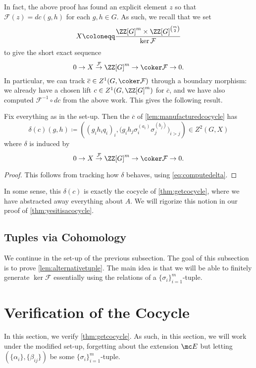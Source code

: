 \documentclass{article}
\numberwithin{equation}{section}
\begin{document}
In fact, the above proof has found an explicit element $z$ so that $\mathcal F(z)=dc(g,h)$ for each $g,h\in G$. As such, we recall that we set
\[X\coloneqq\frac{\ZZ[G]^m\times\ZZ[G]^{\binom m2}}{\ker\mathcal F}\]
to give the short exact sequence
\[0\to X\stackrel{\mathcal F}\to\ZZ[G]^m\to\coker\mathcal F\to0.\]
In particular, we can track $\overline c\in Z^1(G,\coker\mathcal F)$ through a boundary morphism: we already have a chosen lift $c\in Z^1(G,\ZZ[G]^m)$ for $\overline c$, and we have also computed $\mathcal F^{-1}\circ dc$ from the above work. This gives the following result.
\begin{cor}
	Fix everything as in the set-up. Then the $\overline c$ of \autoref{lem:manufacturedcocycle} has
	\[\delta(c)(g,h)\coloneqq\left((g_ih_iq_i)_i,\big(g_ih_j\sigma_i^{(a_i)}\sigma_j^{(b_j)}\big)_{i>j}\right)\in Z^2(G,X)\]
	where $\delta$ is induced by
	\[0\to X\stackrel{\mathcal F}\to\ZZ[G]^m\to\coker\mathcal F\to0.\]
\end{cor}
\begin{proof}
	This follows from tracking how $\delta$ behaves, using \autoref{eq:computedelta}.
\end{proof}
\begin{remark}
	In some sense, this $\delta(c)$ is exactly the cocycle of \autoref{thm:getcocycle}, where we have abstracted away everything about $A$. We will rigorize this notion in our proof of \autoref{thm:yesitisacocycle}.
\end{remark}

\subsection{Tuples via Cohomology}
We continue in the set-up of the previous subsection. The goal of this subsection is to prove \autoref{lem:alternativetuple}. The main idea is that we will be able to finitely generate $\ker\mathcal F$ essentially using the relations of a $\{\sigma_i\}_{i=1}^m$-tuple.

\newpage
\appendix
\section{Verification of the Cocycle} \label{sec:verifycocycle}
In this section, we verify \autoref{thm:getcocycle}. As such, in this section, we will work under the modified set-up, forgetting about the extension $\mc E$ but letting $(\{\alpha_i\},\{\beta_{ij}\})$ be some $\{\sigma_i\}_{i=1}^m$-tuple.
\end{document}
